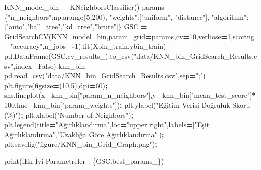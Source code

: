 \documentclass[12pt,twoside]{deuthesis}
\newenvironment{Shaded}{\begin{snugshade}}{\end{snugshade}}
\newcommand{\BuiltInTok}[1]{#1}
\newcommand{\DecValTok}[1]{\textcolor[rgb]{0.00,0.00,0.81}{#1}}
\newcommand{\NormalTok}[1]{#1}
\newcommand{\OperatorTok}[1]{\textcolor[rgb]{0.81,0.36,0.00}{\textbf{#1}}}
\newcommand{\SpecialCharTok}[1]{\textcolor[rgb]{0.00,0.00,0.00}{#1}}
\newcommand{\SpecialStringTok}[1]{\textcolor[rgb]{0.31,0.60,0.02}{#1}}
\newcommand{\StringTok}[1]{\textcolor[rgb]{0.31,0.60,0.02}{#1}}
\newcommand{\VariableTok}[1]{\textcolor[rgb]{0.00,0.00,0.00}{#1}}
\begin{document}
\begin{Shaded}
\begin{Highlighting}[]
\NormalTok{KNN\_model\_bin }\OperatorTok{=}\NormalTok{ KNeighborsClassifier()}
\NormalTok{params }\OperatorTok{=}\NormalTok{ \{}\StringTok{"n\_neighbors"}\NormalTok{:np.arange(}\DecValTok{5}\NormalTok{,}\DecValTok{200}\NormalTok{),}
          \StringTok{"weights"}\NormalTok{:[}\StringTok{"uniform"}\NormalTok{, }\StringTok{"distance"}\NormalTok{],}
          \StringTok{"algorithm"}\NormalTok{:[}\StringTok{"auto"}\NormalTok{,}\StringTok{"ball\_tree"}\NormalTok{,}\StringTok{"kd\_tree"}\NormalTok{,}\StringTok{"brute"}\NormalTok{]\}}
\NormalTok{GSC }\OperatorTok{=}\NormalTok{ GridSearchCV(KNN\_model\_bin,param\_grid}\OperatorTok{=}\NormalTok{params,cv}\OperatorTok{=}\DecValTok{10}\NormalTok{,verbose}\OperatorTok{=}\DecValTok{1}\NormalTok{,scoring}\OperatorTok{=}\StringTok{"accuracy"}\NormalTok{,n\_jobs}\OperatorTok{={-}}\DecValTok{1}\NormalTok{).fit(Xbin\_train,ybin\_train)}
\NormalTok{pd.DataFrame(GSC.cv\_results\_).to\_csv(}\StringTok{"data/KNN\_bin\_GridSearch\_Results.csv"}\NormalTok{,index}\OperatorTok{=}\VariableTok{False}\NormalTok{)}
\NormalTok{knn\_bin }\OperatorTok{=}\NormalTok{ pd.read\_csv(}\StringTok{"data/KNN\_bin\_GridSearch\_Results.csv"}\NormalTok{,sep}\OperatorTok{=}\StringTok{";"}\NormalTok{)}
\NormalTok{plt.figure(figsize}\OperatorTok{=}\NormalTok{(}\DecValTok{10}\NormalTok{,}\DecValTok{5}\NormalTok{),dpi}\OperatorTok{=}\DecValTok{60}\NormalTok{)}\OperatorTok{;}
\NormalTok{sns.lineplot(x}\OperatorTok{=}\NormalTok{knn\_bin[}\StringTok{"param\_n\_neighbors"}\NormalTok{],y}\OperatorTok{=}\NormalTok{knn\_bin[}\StringTok{"mean\_test\_score"}\NormalTok{]}\OperatorTok{*}\DecValTok{100}\NormalTok{,hue}\OperatorTok{=}\NormalTok{knn\_bin[}\StringTok{"param\_weights"}\NormalTok{])}\OperatorTok{;}
\NormalTok{plt.ylabel(}\StringTok{"Eğitim Verisi Doğruluk Skoru (\%)"}\NormalTok{)}\OperatorTok{;}
\NormalTok{plt.xlabel(}\StringTok{"Number of Neighbors"}\NormalTok{)}\OperatorTok{;}
\NormalTok{plt.legend(title}\OperatorTok{=}\StringTok{"Ağırlıklandırma"}\NormalTok{,loc}\OperatorTok{=}\StringTok{"upper right"}\NormalTok{,labels}\OperatorTok{=}\NormalTok{[}\StringTok{"Eşit Ağırlıklandırma"}\NormalTok{,}\StringTok{"Uzaklığa Göre Ağırlıklandırma"}\NormalTok{])}\OperatorTok{;}
\NormalTok{plt.savefig(}\StringTok{"figure/KNN\_bin\_Grid\_Graph.png"}\NormalTok{)}\OperatorTok{;}
\end{Highlighting}
\end{Shaded}
\begin{Shaded}
\begin{Highlighting}[]
\BuiltInTok{print}\NormalTok{(}\SpecialStringTok{f\textquotesingle{}En İyi Parametreler : }\SpecialCharTok{\{}\NormalTok{GSC}\SpecialCharTok{.}\NormalTok{best\_params\_}\SpecialCharTok{\}}\SpecialStringTok{\textquotesingle{}}\NormalTok{)}
\end{Highlighting}
\end{Shaded}
\end{document}

